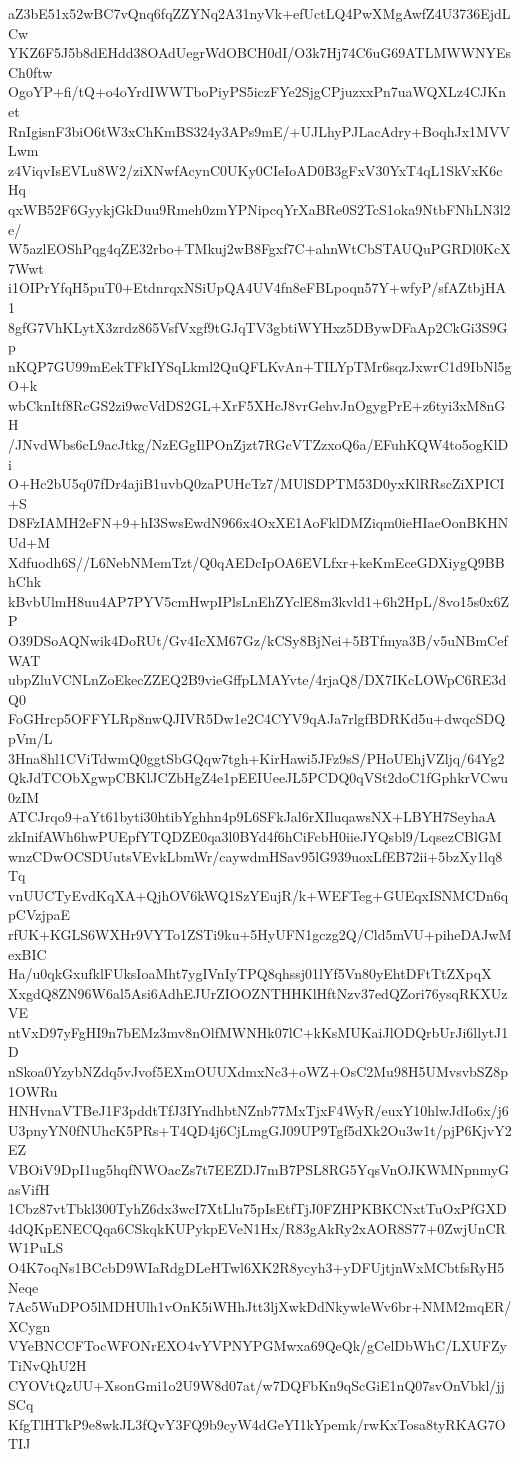 aZ3bE51x52wBC7vQnq6fqZZYNq2A31nyVk+efUctLQ4PwXMgAwfZ4U3736EjdLCw
YKZ6F5J5b8dEHdd38OAdUegrWdOBCH0dI/O3k7Hj74C6uG69ATLMWWNYEsCh0ftw
OgoYP+fi/tQ+o4oYrdIWWTboPiyPS5iczFYe2SjgCPjuzxxPn7uaWQXLz4CJKnet
RnIgisnF3biO6tW3xChKmBS324y3APs9mE/+UJLhyPJLacAdry+BoqhJx1MVVLwm
z4ViqvIsEVLu8W2/ziXNwfAcynC0UKy0CIeIoAD0B3gFxV30YxT4qL1SkVxK6cHq
qxWB52F6GyykjGkDuu9Rmeh0zmYPNipcqYrXaBRe0S2TcS1oka9NtbFNhLN3l2e/
W5azlEOShPqg4qZE32rbo+TMkuj2wB8Fgxf7C+ahnWtCbSTAUQuPGRDl0KcX7Wwt
i1OIPrYfqH5puT0+EtdnrqxNSiUpQA4UV4fn8eFBLpoqn57Y+wfyP/sfAZtbjHA1
8gfG7VhKLytX3zrdz865VsfVxgf9tGJqTV3gbtiWYHxz5DBywDFaAp2CkGi3S9Gp
nKQP7GU99mEekTFkIYSqLkml2QuQFLKvAn+TILYpTMr6sqzJxwrC1d9IbNl5gO+k
wbCknItf8RcGS2zi9wcVdDS2GL+XrF5XHcJ8vrGehvJnOgygPrE+z6tyi3xM8nGH
/JNvdWbs6cL9acJtkg/NzEGgIlPOnZjzt7RGcVTZzxoQ6a/EFuhKQW4to5ogKlDi
O+Hc2bU5q07fDr4ajiB1uvbQ0zaPUHcTz7/MUlSDPTM53D0yxKlRRscZiXPICI+S
D8FzIAMH2eFN+9+hI3SwsEwdN966x4OxXE1AoFklDMZiqm0ieHIaeOonBKHNUd+M
Xdfuodh6S//L6NebNMemTzt/Q0qAEDcIpOA6EVLfxr+keKmEceGDXiygQ9BBhChk
kBvbUlmH8uu4AP7PYV5cmHwpIPlsLnEhZYclE8m3kvld1+6h2HpL/8vo15s0x6ZP
O39DSoAQNwik4DoRUt/Gv4IcXM67Gz/kCSy8BjNei+5BTfmya3B/v5uNBmCefWAT
ubpZluVCNLnZoEkecZZEQ2B9vieGffpLMAYvte/4rjaQ8/DX7IKcLOWpC6RE3dQ0
FoGHrcp5OFFYLRp8nwQJIVR5Dw1e2C4CYV9qAJa7rlgfBDRKd5u+dwqcSDQpVm/L
3Hna8hl1CViTdwmQ0ggtSbGQqw7tgh+KirHawi5JFz9sS/PHoUEhjVZljq/64Yg2
QkJdTCObXgwpCBKlJCZbHgZ4e1pEEIUeeJL5PCDQ0qVSt2doC1fGphkrVCwu0zIM
ATCJrqo9+aYt61byti30htibYghhn4p9L6SFkJal6rXIluqawsNX+LBYH7SeyhaA
zkInifAWh6hwPUEpfYTQDZE0qa3l0BYd4f6hCiFcbH0iieJYQsbl9/LqsezCBlGM
wnzCDwOCSDUutsVEvkLbmWr/caywdmHSav95lG939uoxLfEB72ii+5bzXy1lq8Tq
vnUUCTyEvdKqXA+QjhOV6kWQ1SzYEujR/k+WEFTeg+GUEqxISNMCDn6qpCVzjpaE
rfUK+KGLS6WXHr9VYTo1ZSTi9ku+5HyUFN1gczg2Q/Cld5mVU+piheDAJwMexBIC
Ha/u0qkGxufklFUksIoaMht7ygIVnIyTPQ8qhssj01lYf5Vn80yEhtDFtTtZXpqX
XxgdQ8ZN96W6al5Asi6AdhEJUrZIOOZNTHHKlHftNzv37edQZori76ysqRKXUzVE
ntVxD97yFgHI9n7bEMz3mv8nOlfMWNHk07lC+kKsMUKaiJlODQrbUrJi6llytJ1D
nSkoa0YzybNZdq5vJvof5EXmOUUXdmxNc3+oWZ+OsC2Mu98H5UMvsvbSZ8p1OWRu
HNHvnaVTBeJ1F3pddtTfJ3IYndhbtNZnb77MxTjxF4WyR/euxY10hlwJdIo6x/j6
U3pnyYN0fNUhcK5PRs+T4QD4j6CjLmgGJ09UP9Tgf5dXk2Ou3w1t/pjP6KjvY2EZ
VBOiV9DpI1ug5hqfNWOacZs7t7EEZDJ7mB7PSL8RG5YqsVnOJKWMNpnmyGasVifH
1Cbz87vtTbkl300TyhZ6dx3wcI7XtLlu75pIsEtfTjJ0FZHPKBKCNxtTuOxPfGXD
4dQKpENECQqa6CSkqkKUPykpEVeN1Hx/R83gAkRy2xAOR8S77+0ZwjUnCRW1PuLS
O4K7oqNs1BCcbD9WIaRdgDLeHTwl6XK2R8ycyh3+yDFUjtjnWxMCbtfsRyH5Neqe
7Ac5WuDPO5lMDHUlh1vOnK5iWHhJtt3ljXwkDdNkywleWv6br+NMM2mqER/XCygn
VYeBNCCFTocWFONrEXO4vYVPNYPGMwxa69QeQk/gCelDbWhC/LXUFZyTiNvQhU2H
CYOVtQzUU+XsonGmi1o2U9W8d07at/w7DQFbKn9qScGiE1nQ07svOnVbkl/jjSCq
KfgTlHTkP9e8wkJL3fQvY3FQ9b9cyW4dGeYI1kYpemk/rwKxTosa8tyRKAG7OTIJ
